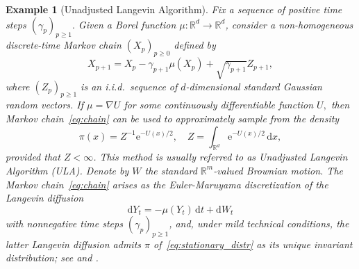 \documentclass[bj]{imsart}
\def\rmd{\mathrm{d}}
\def\rme{\mathrm{e}}
\newtheorem{example}[thm]{Example}
\begin{document}
\begin{example}[Unadjusted Langevin Algorithm]
\label{exam:langevin-algorithm}
Fix a sequence of positive time steps \((\gamma_p)_{p\geq 1}.\) Given a Borel function $\mu\colon\mathbb{R}^{d}\to\mathbb{R}^{d}$,
consider a non-homogeneous
discrete-time Markov chain $(X_{p})_{p\geq0}$ defined by
\begin{equation}\label{eq:chain}
X_{p+1}=X_{p}-\gamma_{p+1}\mu(X_{p})+\sqrt{\gamma_{p+1}}Z_{p+1},\end{equation}
where $\left(Z_{p}\right)_{p\geq1}$ is an i.i.d.\ sequence of $d$-dimensional
standard Gaussian random vectors. If
$\mu= \nabla U$
for some continuously differentiable function $U,$ then Markov chain~\eqref{eq:chain} can be used to approximately sample from the density
\begin{equation}\label{eq:stationary_distr}
\pi(x)= Z^{-1} \rme^{-U(x)/2}, \quad Z= \int_{\mathbb{R}^{d}} \rme^{-U(x)/2}\, \rmd x,
\end{equation}
provided that \(Z < \infty\).
This method is usually referred to as Unadjusted Langevin Algorithm (ULA).
Denote by \(W\) the standard \(\mathbb{R}^m\)-valued Brownian motion.
The Markov chain~\eqref{eq:chain}
arises as the Euler-Maruyama discretization
of the Langevin diffusion
\[
\rmd Y_t=-\mu(Y_t)\,\rmd t+ \rmd W_t
\]
with nonnegative time steps $(\gamma_p)_{p\ge1}$,
and,  under mild technical conditions, the latter Langevin diffusion admits $\pi$
of~\eqref{eq:stationary_distr}
as its unique invariant distribution; see \cite{dalalyan2017theoretical} and \cite{durmus:moulines:2017}.
\end{example}
\end{document}
